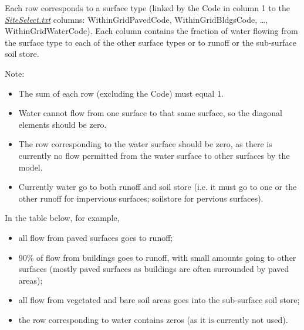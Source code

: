 \documentclass[letterpaper,10pt,english]{sphinxmanual}
\begin{document}
Each row corresponds to a surface type (linked by the Code in column 1
to the {\hyperref[\detokenize{input_files/SUEWS_SiteInfo/SUEWS_WithinGridWaterDist:SiteSelect.txt}]{\emph{SiteSelect.txt}}} columns:
WithinGridPavedCode, WithinGridBldgsCode, …, WithinGridWaterCode). Each
column contains the fraction of water flowing from the surface type to
each of the other surface types or to runoff or the sub-surface soil
store.

Note:
\begin{itemize}
\item {} 
The sum of each row (excluding the Code) must equal 1.

\item {} 
Water cannot flow from one surface to that same surface, so the
diagonal elements should be zero.

\item {} 
The row corresponding to the water surface should be zero, as there
is currently no flow permitted from the water surface to other
surfaces by the model.

\item {} 
Currently water  go to both runoff and soil store (i.e. it
must go to one or the other \textendash{} runoff for impervious surfaces;
soilstore for pervious surfaces).

\end{itemize}

In the table below, for example,
\begin{itemize}
\item {} 
all flow from paved surfaces goes to runoff;

\item {} 
90\% of flow from buildings goes to runoff, with small amounts going
to other surfaces (mostly paved surfaces as buildings are often
surrounded by paved areas);

\item {} 
all flow from vegetated and bare soil areas goes into the sub-surface
soil store;

\item {} 
the row corresponding to water contains zeros (as it is currently not
used).

\end{itemize}
\end{document}

